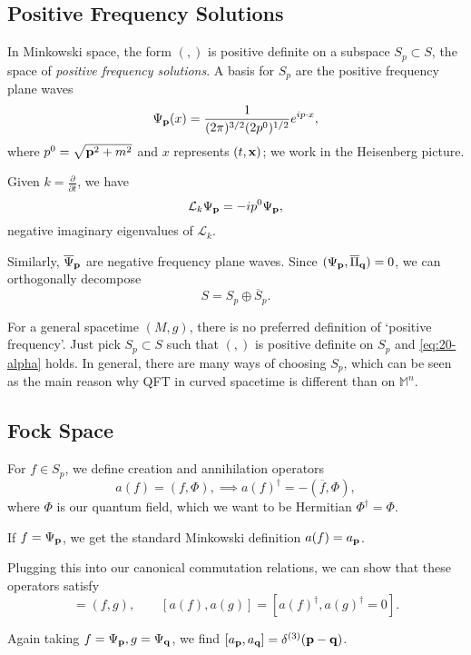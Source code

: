 \subsection*{Positive Frequency Solutions}%

In Minkowski space, the form $(, )$ is positive definite on a subspace $S_p \subset S$, the space of \emph{positive frequency solutions}.
A basis for $S_p$ are the positive frequency plane waves
\begin{equation}
  \Psi_{\vb{p}} (x) = \frac{1}{(2\pi)^{3 / 2} (2 p^0)^{1 / 2}}e^{i p \cdot x},
\end{equation}
where $p^0 = \sqrt{\vb{p}^2 + m^2}$ and $x$ represents $(t, \vb{x})$; we work in the Heisenberg picture.

Given $k = \frac{\partial }{\partial t}$, we have 
\begin{equation}
  \mathcal{L}_k \Psi_{\vb{p}} = -i p^0 \Psi_{\vb{p}},
\end{equation}
negative imaginary eigenvalues of $\mathcal{L}_k$.

Similarly, $\overline{\Psi}{}_{\vb{p}}$ are negative frequency plane waves.
Since $(\Psi_{\vb{p}}, \overline{\Pi}{}_{\vb{q}}) = 0$, we can orthogonally decompose
\begin{equation}
  S = S_p \oplus \overline{S}{}_p. \label{eq:20-alpha}
\end{equation}

For a general spacetime $(M, g)$, there is no preferred definition of `positive frequency'. Just pick $S_p \subset S$ such that $(, )$ is positive definite on $S_p$ and \eqref{eq:20-alpha} holds.
In general, there are many ways of choosing $S_p$, which can be seen as the main reason why QFT in curved spacetime is different than on $\mathbb{M}^n$.

\subsection*{Fock Space}%

For $f \in S_p$, we define creation and annihilation operators
\begin{equation}
  a(f) = (f, \Phi), \implies a(f)^{\dagger} = -(\overline{f}{}, \Phi),
\end{equation}
where $\Phi$ is our quantum field, which we want to be Hermitian $\Phi^{\dagger} = \Phi$.
\begin{example}[]
  If $f = \Psi_{\vb{p}}$, we get the standard Minkowski definition $a(f) = a_{\vb{p}}$.
\end{example}
\begin{exercise}[Sheet 4]
  Plugging this into our canonical commutation relations, we can show that these operators satisfy
  \begin{equation}
    [a(f), a(g)^{\dagger}] = (f, g), \qquad [a(f), a(g)] = [a(f)^{\dagger}, a(g)^{\dagger} = 0].
  \end{equation}
\end{exercise}
\begin{example}[]
  Again taking $f = \Psi_{\vb{p}}, g = \Psi_{\vb{q}}$, we find $[a_{\vb{p}}, a_{\vb{q}}] = \delta^{(3)}(\vb{p} - \vb{q})$.
\end{example}

